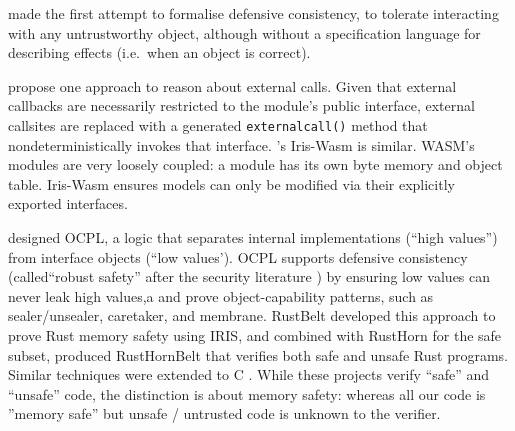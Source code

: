 \citet{Murray10dphil} made the first attempt to formalise defensive
consistency, %
to tolerate interacting with any untrustworthy object,
although without a specification language for describing effects
(i.e.\ when an object is correct).

 \citet{CassezFQ24} propose one approach to reason about external calls.
Given that external callbacks are necessarily restricted to the module's public interface,
external callsites are replaced  with a
generated \texttt{externalcall()} method that  nondeterministically invokes that interface.
\citet{iris-wasm-pldi2023}'s Iris-Wasm is similar.
WASM's
modules are very loosely coupled: a module
has its own byte memory
and object table.
Iris-Wasm ensures models 
can only be
modified via their explicitly exported interfaces. 
 
 

\citet{ddd}  designed OCPL, a logic
that separates internal implementations (``high values'')
from interface objects
(``low values'). %
OCPL supports defensive
consistency %
(called``robust safety'' after the
security literature \cite{Bengtson})
by ensuring
low values can never leak high values,a %
and 
prove %
object-capability patterns, such as
sealer/unsealer, caretaker, and membrane.
%
%
RustBelt \cite{RustBelt18}
developed this approach to prove Rust memory safety using IRIS\cite{iris-jfp2018},
and combined with RustHorn \cite{RustHorn-toplas2021} for the safe subset,
produced RustHornBelt \cite{RustHornBelt-pldi2022} that verifies
both safe and unsafe Rust programs.%
Similar techniques were extended to C \cite{RefinedC-pldi2021}.
While these projects 
verify ``safe'' and ``unsafe'' code, 
%
the distinction is about memory safety:%
%
%
%
whereas all our code is ''memory safe''
but unsafe / untrusted code is unknown to the verifier.

